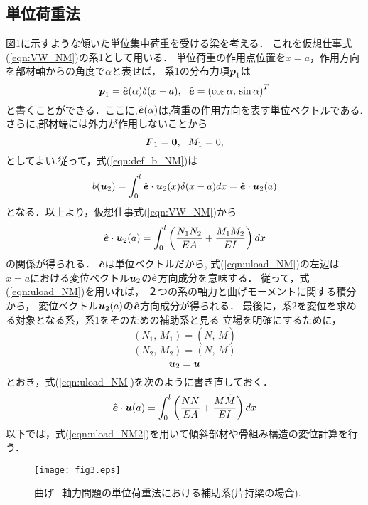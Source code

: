 ﻿\documentclass[10pt,a4j]{jarticle}
\begin{document}
\subsection{単位荷重法}
図\ref{fig:fig3}に示すような傾いた単位集中荷重を受ける梁を考える．
これを仮想仕事式(\ref{eqn:VW_NM})の系1として用いる．
単位荷重の作用点位置を$x=a$，作用方向を部材軸からの角度で$\alpha$と表せば，
系1の分布力項$\mbox{\boldmath $p$}_1$は
\begin{equation}
	\fat{p}_1=\hat{\fat{e}}(\alpha)\delta(x-a), \ \ 
	\hat{\fat{e}}=\left( \cos\alpha,\, \sin \alpha \right)^T
	\label{eqn:aux}
\end{equation}
と書くことができる．ここに,$\hat{\mbox{\boldmath $e$}}(\alpha)$は,荷重の作用方向を表す単位ベクトルである.
さらに,部材端には外力が作用しないことから
\begin{equation}
	\bar{\mbox{\boldmath $F$}}_1=\mbox{\boldmath $0$},\ \ \bar M_1=0,
	\label{eqn:aux}
\end{equation}
としてよい.従って，式(\ref{eqn:def_b_NM})は
\begin{equation}
	b(\mbox{\boldmath $u$}_2)=
	\int_0^l \hat{\mbox{\boldmath $e$}}\cdot \mbox{\boldmath $u$}_2(x)\delta(x-a) dx
	=
	\hat{\mbox{\boldmath $e$}}\cdot\mbox{\boldmath $u$}_2(a) 
	\label{eqn:dlt_smp}
\end{equation}
となる．以上より，仮想仕事式(\ref{eqn:VW_NM})から
\begin{equation}
	\hat{\mbox{\boldmath $e$}}\cdot\mbox{\boldmath $u$}_2(a) 
	=
	\int_0^l \left( \frac{N_1N_2}{EA}+ \frac{M_1M_2}{EI} \right) dx 
	\label{eqn:uload_NM}
\end{equation}
の関係が得られる．
$\hat{\mbox{\boldmath $e$}}$は単位ベクトルだから, 式(\ref{eqn:uload_NM})の左辺は
$x=a$における変位ベクトル$\mbox{\boldmath $u$}_2$の$\hat{\mbox{\boldmath $e$}}$方向成分を意味する．
従って，式(\ref{eqn:uload_NM})を用いれば，
２つの系の軸力と曲げモーメントに関する積分から，
変位ベクトル$\mbox{\boldmath $u$}_2(a)$の$\hat{\mbox{\boldmath $e$}}$方向成分が得られる．
最後に，系2を変位を求める対象となる系，系1をそのための補助系と見る
立場を明確にするために，
\begin{equation}
	\left(N_1,\, M_1\right) = \left( \tilde{N},\, \tilde{M}\right)
\end{equation}
\begin{equation}
	\left(N_2,\, M_2\right) = \left( N,\, M\right)
\end{equation}
\begin{equation}
	\mbox{\boldmath $u$}_2=\mbox{\boldmath $u$}
\end{equation}
とおき，式(\ref{eqn:uload_NM})を次のように書き直しておく．
\begin{equation}
	\hat{\mbox{\boldmath $e$}}\cdot\mbox{\boldmath $u$}(a) 
	=
	\int_0^l \left( \frac{N \tilde N }{EA}+ \frac{M \tilde M }{EI} \right) dx 
	\label{eqn:uload_NM2}
\end{equation}
以下では，式(\ref{eqn:uload_NM2})を用いて傾斜部材や骨組み構造の変位計算を行う．
\begin{figure}[h]
	\begin{center}
	\texttt{[image: fig3.eps]} 
	\end{center}
	\caption{曲げ−軸力問題の単位荷重法における補助系(片持梁の場合).} 
	\label{fig:fig3}
\end{figure}
\end{document}
